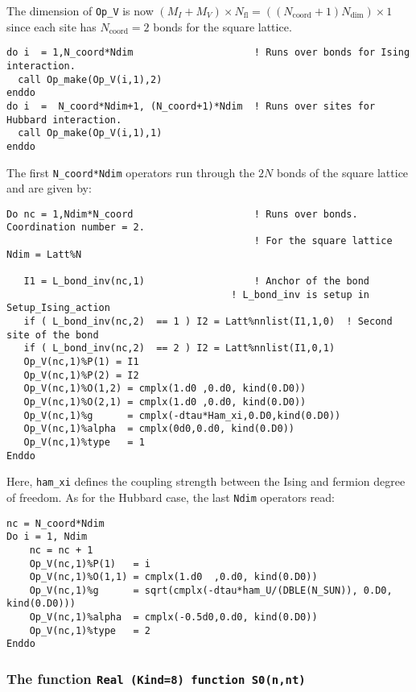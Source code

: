 The dimension of   \texttt{Op\_V}  is now  $(M_I + M_V)\times N_{\mathrm{fl}}=((N_\text{coord} +  1 )N_{\text{dim}}) \times 1$ since each site has $N_\text{coord} =2$ bonds   for the square lattice.
\begin{lstlisting}[style=fortran]
do i  = 1,N_coord*Ndim                     ! Runs over bonds for Ising interaction.
  call Op_make(Op_V(i,1),2)
enddo
do i  =  N_coord*Ndim+1, (N_coord+1)*Ndim  ! Runs over sites for Hubbard interaction.
  call Op_make(Op_V(i,1),1)
enddo
\end{lstlisting}
The  first  \texttt{N\_coord*Ndim} operators run through the $2N$ bonds of the square lattice and   are given by:
\begin{lstlisting}[style=fortran]
Do nc = 1,Ndim*N_coord                     ! Runs over bonds. Coordination number = 2.
                                           ! For the square lattice Ndim = Latt%N
  
   I1 = L_bond_inv(nc,1)                   ! Anchor of the bond
	                                   ! L_bond_inv is setup in Setup_Ising_action
   if ( L_bond_inv(nc,2)  == 1 ) I2 = Latt%nnlist(I1,1,0)  ! Second site of the bond 
   if ( L_bond_inv(nc,2)  == 2 ) I2 = Latt%nnlist(I1,0,1) 
   Op_V(nc,1)%P(1) = I1
   Op_V(nc,1)%P(2) = I2
   Op_V(nc,1)%O(1,2) = cmplx(1.d0 ,0.d0, kind(0.D0))
   Op_V(nc,1)%O(2,1) = cmplx(1.d0 ,0.d0, kind(0.D0))
   Op_V(nc,1)%g      = cmplx(-dtau*Ham_xi,0.D0,kind(0.D0))
   Op_V(nc,1)%alpha  = cmplx(0d0,0.d0, kind(0.D0))
   Op_V(nc,1)%type   = 1
Enddo
\end{lstlisting}
Here,  \texttt{ham\_xi} defines the coupling strength  between the Ising  and fermion degree of freedom.
As for the Hubbard case, the last \texttt{Ndim}  operators read: 
\begin{lstlisting}[style=fortran]
nc = N_coord*Ndim 
Do i = 1, Ndim
    nc = nc + 1
    Op_V(nc,1)%P(1)   = i 
    Op_V(nc,1)%O(1,1) = cmplx(1.d0  ,0.d0, kind(0.D0))
    Op_V(nc,1)%g      = sqrt(cmplx(-dtau*ham_U/(DBLE(N_SUN)), 0.D0, kind(0.D0)))
    Op_V(nc,1)%alpha  = cmplx(-0.5d0,0.d0, kind(0.D0))
    Op_V(nc,1)%type   = 2
Enddo
\end{lstlisting}

\subsubsection{The function \texttt{Real (Kind=8) function S0(n,nt)} }\label{sec:s0}

